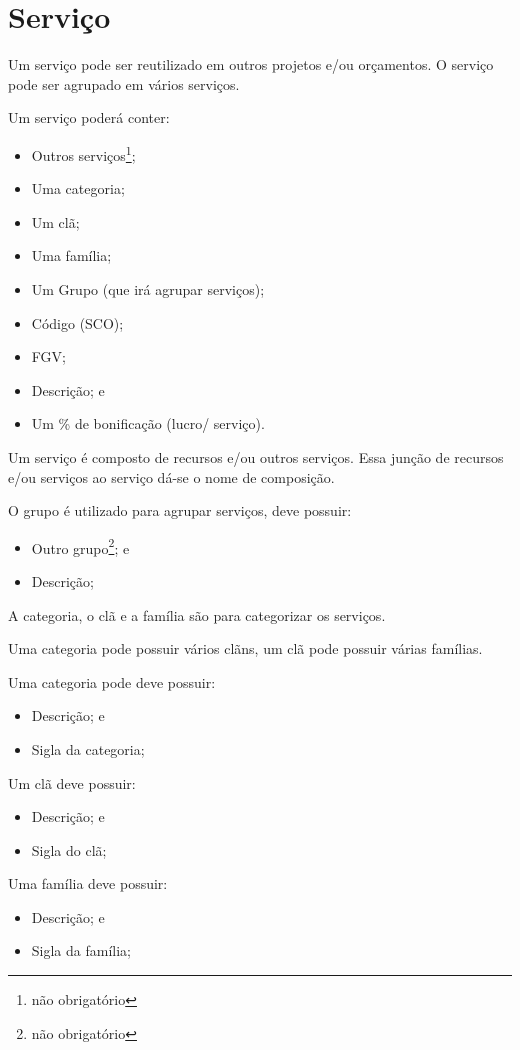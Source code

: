 \chapter{Serviço}

Um serviço pode ser reutilizado em outros projetos e/ou orçamentos.
O serviço pode ser agrupado em vários serviços.

Um serviço poderá conter:

\begin{itemize}
	\item Outros serviços\footnote{não obrigatório};
	\item Uma categoria;
	\item Um clã;
	\item Uma família;
	\item Um Grupo (que irá agrupar serviços);
	\item Código (SCO);
	\item FGV;
	\item Descrição; e
	\item Um \% de bonificação (lucro/ serviço).
\end{itemize}

Um serviço é composto de recursos e/ou outros serviços. Essa junção de recursos e/ou serviços ao serviço dá-se o nome de composição.

O grupo é utilizado para agrupar serviços, deve possuir:

\begin{itemize}
	\item Outro grupo\footnote{não obrigatório}; e
	\item Descrição;
\end{itemize}

A categoria, o clã e a família são para categorizar os serviços.

Uma categoria pode possuir vários clãns, um clã pode possuir várias famílias.

Uma categoria pode deve possuir:

\begin{itemize}
	\item Descrição; e
	\item Sigla da categoria;
\end{itemize}

Um clã deve possuir:

\begin{itemize}
	\item Descrição; e
	\item Sigla do clã;
\end{itemize}

Uma família deve possuir:

\begin{itemize}
	\item Descrição; e
	\item Sigla da família;
\end{itemize}